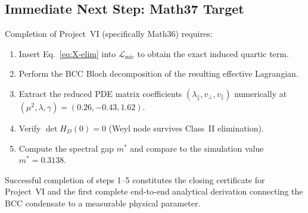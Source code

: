 \documentclass[reprint,aps,pre,onecolumn,superscriptaddress,amsmath,amssymb]{revtex4-2}
\begin{document}
\subsection{Immediate Next Step: Math37 Target}

Completion of Project~VI (specifically Math36) requires:
\begin{enumerate}
  \item Insert Eq.~\eqref{eq:X-elim} into $\mathcal{L}_{\mathrm{mic}}$
        to obtain the exact induced quartic term.
  \item Perform the BCC Bloch decomposition of the resulting effective Lagrangian.
  \item Extract the reduced PDE matrix coefficients $(\lambda_{\parallel}, v_{\perp}, v_{\parallel})$
        numerically at $(\mu^{2},\lambda,\gamma) = (0.26, -0.43, 1.62)$.
  \item Verify $\det H_{D}(0) = 0$ (Weyl node survives Class~II elimination).
  \item Compute the spectral gap $m^{*}$ and compare to the simulation value
        $m^{*} = 0.3138$.
\end{enumerate}
Successful completion of steps 1--5 constitutes the closing certificate
for Project~VI and the first complete end-to-end analytical derivation
connecting the BCC condensate to a measurable physical parameter.
\end{document}
